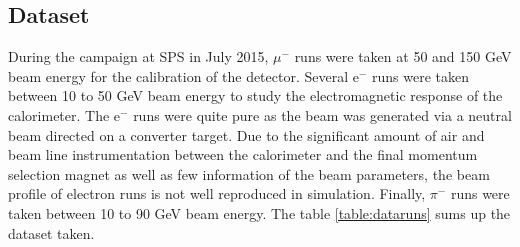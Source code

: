 \documentclass[twoside,a4paper,11pt]{article}
\begin{document}
\subsection{Dataset}
\label{subsec:dataset}
During the campaign at SPS in July 2015, $\mu^-$ runs were taken at 50 and 150 GeV beam energy for the calibration of the detector. Several e$^{-}$ runs were taken between 10 to 50 GeV beam energy to study the electromagnetic response of the calorimeter. The e$^{-}$ runs were quite pure as the beam was generated via a neutral beam directed on a converter target. Due to the significant amount of air and beam line instrumentation between the calorimeter and the final momentum selection magnet as well as few information of the beam parameters, the beam profile of electron runs is not well reproduced in simulation. Finally, $\pi^-$ runs were taken between 10 to 90 GeV beam energy. The table \ref{table:dataruns} sums up the dataset taken.
\begin{table}[htbp]
\centering
{}
  \caption{List of runs taken at SPS in July 2015.}
  \label{table:dataruns}
\end{table}
\end{document}
